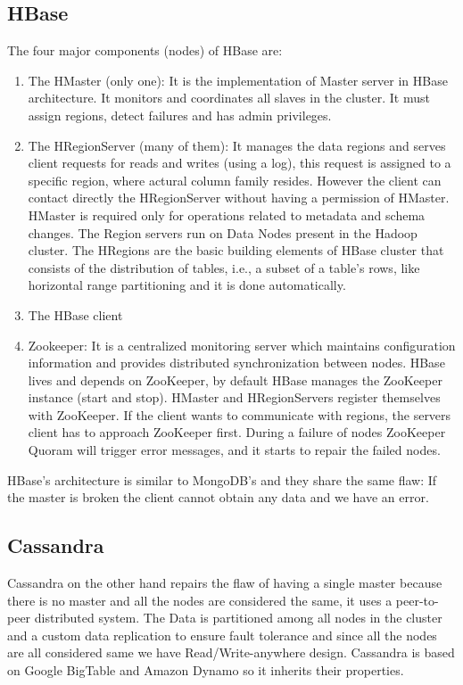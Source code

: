 \documentclass[a4page, 11pt]{article}
\begin{document}
\subsection{HBase\cite{guru99}}
The four major components (nodes) of HBase are:
\begin{enumerate}[noitemsep]
	\item The HMaster (only one): It is the implementation of Master server in HBase architecture. It monitors and coordinates all slaves in the cluster. It must assign regions, detect failures and has admin privileges. 
	\item The HRegionServer (many of them): It manages the data regions and serves client requests for reads and writes (using a log), this request is assigned to a specific region, where actural column family resides. However the client can contact directly the HRegionServer without having a permission of HMaster. HMaster is required only for operations related to metadata and schema changes. The Region servers run on Data Nodes present in the Hadoop cluster.\newline
	The HRegions are the basic building elements of HBase cluster that consists of the distribution of tables, i.e., a subset of a table's rows, like horizontal range partitioning and it is done automatically.
	\item The HBase client
	\item Zookeeper: It is a centralized monitoring server which maintains configuration information and provides distributed synchronization between nodes.
	HBase lives and depends on ZooKeeper, by default HBase manages the ZooKeeper instance (start and stop). 
	HMaster and HRegionServers register themselves with ZooKeeper.
	If the client wants to communicate with regions, the servers client has to approach ZooKeeper first.
	During a failure of nodes ZooKeeper Quoram will trigger error messages, and it starts to repair the failed nodes.
\end{enumerate}

HBase's architecture is similar to MongoDB's and they share the same flaw: If the master is broken the client cannot obtain any data and we have an error.

\subsection{Cassandra}
Cassandra on the other hand repairs the flaw of having a single master because there is no master and all the nodes are considered the same, it uses a peer-to-peer distributed system. 
The Data is partitioned among all nodes in the cluster and a custom data replication to ensure fault tolerance and since all the nodes are all considered same we have Read/Write-anywhere design.
Cassandra is based on Google BigTable and Amazon Dynamo so it inherits their properties.
\end{document}
